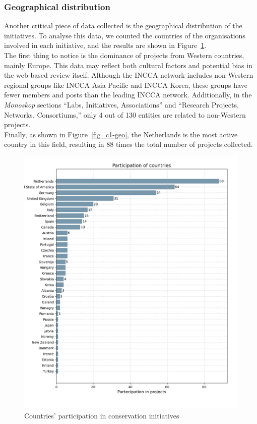 \subsubsection{Geographical distribution}
Another critical piece of data collected is the geographical distribution of the initiatives. To analyse this data, we counted the countries of the organisations involved in each initiative, and the results are shown in Figure~\ref{fig:c1-geo}.\\
The first thing to notice is the dominance of projects from Western countries, mainly Europe. This data may reflect both cultural factors and potential bias in the web-based review itself. Although the INCCA network includes non-Western regional groups like INCCA Asia Pacific and INCCA Korea, these groups have fewer members and posts than the leading INCCA network. Additionally, in the \textit{Monoskop} sections ``Labs, Initiatives, Associations'' and ``Research Projects, Networks, Consortiums,'' only 4 out of 130 entities are related to non-Western projects.\\
Finally, as shown in Figure~\ref{fig_c1-geo}, the Netherlands is the most active country in this field, resulting in 88 times the total number of projects collected.

\begin{figure}[!h]
    \centering
    \includegraphics[width=\textwidth]{chapters/1-state_of_the_art/image/plot01-countries.png}
    \caption{Countries’ participation in conservation initiatives}
    \label{fig:c1-geo}
\end{figure}

